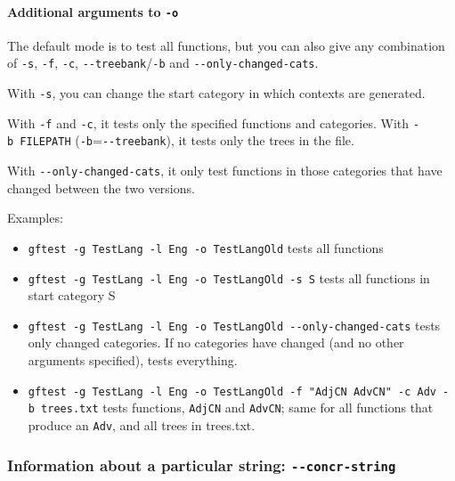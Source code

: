 \hypertarget{additional-arguments-to--o}{%
\paragraph{\texorpdfstring{Additional arguments to
\texttt{-o}}{Additional arguments to -o}}\label{additional-arguments-to--o}}

The default mode is to test all functions, but you can also give any
combination of \texttt{-s}, \texttt{-f}, \texttt{-c},
\texttt{-\/-treebank}/\texttt{-b} and \texttt{-\/-only-changed-cats}.

With \texttt{-s}, you can change the start category in which contexts
are generated.

With \texttt{-f} and \texttt{-c}, it tests only the specified functions
and categories. With \texttt{-b\ FILEPATH}
(\texttt{-b}=\texttt{-\/-treebank}), it tests only the trees in the
file.

With \texttt{-\/-only-changed-cats}, it only test functions in those
categories that have changed between the two versions.

Examples:

\begin{itemize}
\tightlist
\item
  \texttt{gftest\ -g\ TestLang\ -l\ Eng\ -o\ TestLangOld} tests all
  functions
\item
  \texttt{gftest\ -g\ TestLang\ -l\ Eng\ -o\ TestLangOld\ -s\ S} tests
  all functions in start category S
\item
  \texttt{gftest\ -g\ TestLang\ -l\ Eng\ -o\ TestLangOld\ -\/-only-changed-cats}
  tests only changed categories. If no categories have changed (and no
  other arguments specified), tests everything.
\item
  \texttt{gftest\ -g\ TestLang\ -l\ Eng\ -o\ TestLangOld\ -f\ "AdjCN\ AdvCN"\ -c\ Adv\ -b\ trees.txt}
  tests functions, \texttt{AdjCN} and \texttt{AdvCN}; same for all
  functions that produce an \texttt{Adv}, and all trees in trees.txt.
\end{itemize}

\hypertarget{information-about-a-particular-string---concr-string}{%
\subsubsection{\texorpdfstring{Information about a particular string:
\texttt{-\/-concr-string}}{Information about a particular string: -\/-concr-string}}\label{information-about-a-particular-string---concr-string}}

